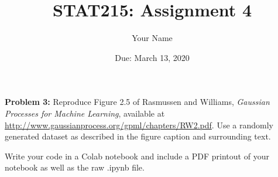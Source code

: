 \documentclass[11pt]{article}
\title{STAT215: Assignment 4}
\author{Your Name}
\date{Due: March 13, 2020}
\begin{document}
\maketitle

 \clearpage 

\clearpage 

\textbf{Problem 3:} Reproduce Figure 2.5 of Rasmussen and Williams, \textit{Gaussian Processes for Machine Learning}, available at \url{http://www.gaussianprocess.org/gpml/chapters/RW2.pdf}.  Use a randomly generated dataset as described in the figure caption and surrounding text. 

Write your code in a Colab notebook and include a PDF printout of your notebook as well as the raw .ipynb file.
\end{document}
